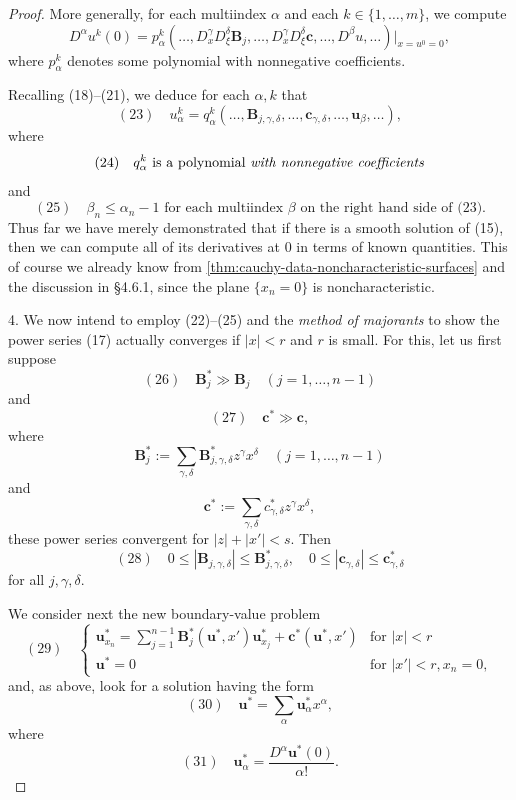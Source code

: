 \begin{proof}
More generally, for each multiindex $\alpha$ and each $k \in \{1,\ldots,m\}$, we compute
$$D^\alpha u^k(0) = p_\alpha^k(\ldots, D_x^\gamma D_\xi^\delta \mathbf{B}_j, \ldots, D_x^\gamma D_\xi^\delta \mathbf{c}, \ldots, D^\beta u, \ldots)|_{x=u^0=0},$$
where $p_\alpha^k$ denotes some polynomial with nonnegative coefficients.

Recalling (18)--(21), we deduce for each $\alpha, k$ that
$$(23) \quad u_\alpha^k = q_\alpha^k(\ldots, \mathbf{B}_{j,\gamma,\delta}, \ldots, \mathbf{c}_{\gamma,\delta}, \ldots, \mathbf{u}_\beta, \ldots),$$
where
$$(24) \quad q_\alpha^k \text{ is a polynomial \textit{with nonnegative coefficients}}$$
and
$$(25) \quad \beta_n \leq \alpha_n - 1 \text{ for each multiindex } \beta \text{ on the right hand side of (23)}.$$
Thus far we have merely demonstrated that if there is a smooth solution of (15), then we can compute all of its derivatives at 0 in terms of known quantities. This of course we already know from \cref{thm:cauchy-data-noncharacteristic-surfaces} and the discussion in \S4.6.1, since the plane $\{x_n = 0\}$ is noncharacteristic.

4. We now intend to employ (22)--(25) and the \textit{method of majorants} to show the power series (17) actually converges if $|x| < r$ and $r$ is small. For this, let us first suppose
$$(26) \quad \mathbf{B}_j^* \gg \mathbf{B}_j \quad (j = 1, \ldots, n-1)$$
and
$$(27) \quad \mathbf{c}^* \gg \mathbf{c},$$
where
$$\mathbf{B}_j^* := \sum_{\gamma,\delta} \mathbf{B}_{j,\gamma,\delta}^* z^\gamma x^\delta \quad (j = 1, \ldots, n-1)$$
and
$$\mathbf{c}^* := \sum_{\gamma,\delta} c_{\gamma,\delta}^* z^\gamma x^\delta,$$
these power series convergent for $|z|+|x'|<s$. Then
$$(28) \quad 0\le |\mathbf{B}_{j,\gamma,\delta}| \le \mathbf{B}^*_{j,\gamma,\delta}, \quad 0\le |\mathbf{c}_{\gamma,\delta}| \le \mathbf{c}^*_{\gamma,\delta}$$
for all $j,\gamma,\delta$.

We consider next the new boundary-value problem
$$(29) \quad \begin{cases} \mathbf{u}^*_{x_n} = \sum_{j=1}^{n-1} \mathbf{B}^*_j(\mathbf{u}^*,x')\mathbf{u}^*_{x_j} + \mathbf{c}^*(\mathbf{u}^*,x') & \text{for } |x|<r \\ \mathbf{u}^*=0 & \text{for } |x'|<r, x_n=0, \end{cases}$$
and, as above, look for a solution having the form
$$(30) \quad \mathbf{u}^* = \sum_\alpha \mathbf{u}^*_\alpha x^\alpha,$$
where
$$(31) \quad \mathbf{u}^*_\alpha = \frac{D^\alpha\mathbf{u}^*(0)}{\alpha!}.$$


\end{proof}
